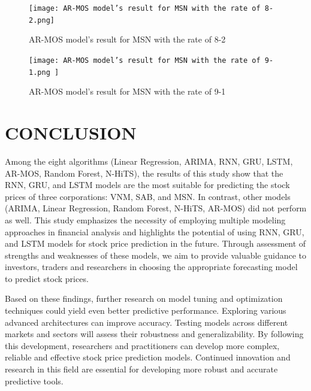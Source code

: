 \documentclass{ieeeojies}
\begin{document}
    \begin{figure}[H]
    \begin{minipage}{0.23\textwidth}
    \centering
    \texttt{[image: AR-MOS model’s result for MSN with the rate of 8-2.png]}
    \caption{AR-MOS model’s result for MSN with the rate of 8-2}
    \end{minipage}
    \hfill
    \begin{minipage}{0.23\textwidth}
    \centering
    \texttt{[image: AR-MOS model’s result for MSN with the rate of 9-1.png ]}
    \caption{AR-MOS model’s result for MSN with the rate of 9-1}
    \end{minipage}
    \end{figure}
   \section{CONCLUSION}
Among the eight algorithms (Linear Regression, ARIMA, RNN, GRU, LSTM, AR-MOS, Random Forest, N-HiTS), the results of this study show that the RNN, GRU, and LSTM models are the most suitable for predicting the stock prices of three corporations: VNM, SAB, and MSN. In contrast, other models (ARIMA, Linear Regression, Random Forest, N-HiTS, AR-MOS) did not perform as well. This study emphasizes the necessity of employing multiple modeling approaches in financial analysis and highlights the potential of using RNN, GRU, and LSTM models for stock price prediction in the future. Through assessment of strengths and weaknesses of these models, we aim to provide valuable guidance to investors, traders and researchers in choosing the appropriate forecasting model to predict stock prices.

Based on these findings, further research on model tuning and optimization techniques could yield even better predictive performance. Exploring various advanced architectures can improve accuracy. Testing models across different markets and sectors will assess their robustness and generalizability. By following this development, researchers and practitioners can develop more complex, reliable and effective stock price prediction models. Continued innovation and research in this field are essential for developing more robust and accurate predictive tools.
\end{document}
